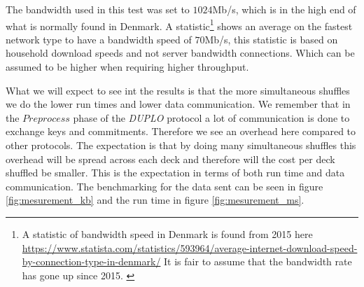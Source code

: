 \documentclass[twoside,11pt,openright]{report}
\newcommand{\DUPLO}{\textit{DUPLO} }
\begin{document}
The bandwidth used in this test was set to $1024$Mb/s, which is in the high end of what is normally found in Denmark. A statistic\footnote{A statistic of bandwidth speed in Denmark is found from 2015 here \linebreak \url{https://www.statista.com/statistics/593964/average-internet-download-speed-by-connection-type-in-denmark/} \linebreak It is fair to assume that the bandwidth rate has gone up since 2015. \label{footnote:bandwith_stats}} shows an average on the fastest network type to have a bandwidth speed of $70$Mb/s, this statistic is based on household download speeds and not server bandwidth connections. Which can be assumed to be higher when requiring higher throughput.

\bigskip

What we will expect to see int the results is that the more simultaneous shuffles we do the lower run times and lower data communication. We remember that in the $Preprocess$ phase of the \DUPLO protocol a lot of communication is done to exchange keys and commitments. Therefore we see an overhead here compared to other protocols. The expectation is that by doing many simultaneous shuffles this overhead will be spread across each deck and therefore will the cost per deck shuffled be smaller. This is the expectation in terms of both run time and data communication. The benchmarking for the data sent can be seen in figure \ref{fig:mesurement_kb} and the run time in figure \ref{fig:mesurement_ms}.
\end{document}
